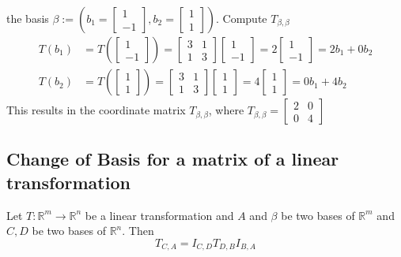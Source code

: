 \begin{enumerate}
    the basis $\beta := (b_1  = \begin{bmatrix} 1 \\ -1 \end{bmatrix}, 
    b_2 = \begin{bmatrix} 1 \\ 1 \end{bmatrix})$. Compute $T_{\beta, 
    \beta}$
\[
  \begin{aligned}
    T(b_1) &= T(\begin{bmatrix} 1 \\ -1 \end{bmatrix}) = \begin{bmatrix}
    3 & 1 \\ 1 & 3 \end{bmatrix} \begin{bmatrix} 1 \\ -1 \end{bmatrix} 
    = 2 \begin{bmatrix} 1 \\ -1 \end{bmatrix} = 2b_1 + 0b_2 \\
    T(b_2) &= T(\begin{bmatrix} 1 \\ 1 \end{bmatrix}) = 
    \begin{bmatrix} 3 & 1 \\ 1 & 3 \end{bmatrix} 
    \begin{bmatrix} 1 \\ 1 \end{bmatrix} = 4 \begin{bmatrix} 1 \\ 1 
  \end{bmatrix} = 0b_1 + 4b_2
  \end{aligned}
\]
This results in the coordinate matrix $T_{\beta, \beta}$, where 
$T_{\beta, \beta} = \begin{bmatrix} 2 & 0 \\ 0 & 4 \end{bmatrix}$
\subsection{Change of Basis for a matrix of a linear transformation} 
Let $T : \mathbb{R}^m \rightarrow \mathbb{R}^n$ be a linear 
transformation and $A$ and $\beta$ be two bases of $\mathbb{R}^m$ and 
$C, D$ be two bases of $\mathbb{R}^n$. Then 
\[
  T_{C, A} = I_{C, D}T_{D, B}I_{B, A}
\]

\end{enumerate}
